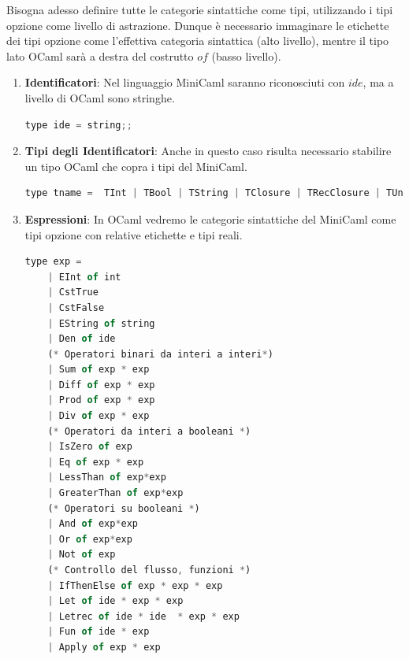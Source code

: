\documentclass{article}
\begin{document}
Bisogna adesso definire tutte le categorie sintattiche come tipi, utilizzando i tipi opzione come livello di astrazione. Dunque è necessario immaginare le etichette dei tipi opzione come l'effettiva categoria sintattica (alto livello), mentre il tipo lato OCaml sarà a destra del costrutto $of$ (basso livello).


\begin{enumerate}
    \item \textbf{Identificatori}: Nel linguaggio MiniCaml saranno riconosciuti con $ide$, ma a livello di OCaml sono stringhe.
    \vspace*{10px}
\begin{lstlisting}[language = JavaScript]
    type ide = string;;
\end{lstlisting}
\vspace*{-20px}

    \item \textbf{Tipi degli Identificatori}: Anche in questo caso risulta necessario stabilire un tipo OCaml che copra i tipi del MiniCaml.
    \vspace*{10px}
\begin{lstlisting}[language = JavaScript]
    type tname =  TInt | TBool | TString | TClosure | TRecClosure | TUnBound
\end{lstlisting}
\vspace*{-20px}

\newpage

    \item \textbf{Espressioni}: In OCaml vedremo le categorie sintattiche del MiniCaml come tipi opzione con relative etichette e tipi reali.
    \vspace*{10px}
\begin{lstlisting}[language = JavaScript]
    type exp = 
    | EInt of int
    | CstTrue 
    | CstFalse
    | EString of string
    | Den of ide
    (* Operatori binari da interi a interi*)
    | Sum of exp * exp
    | Diff of exp * exp
    | Prod of exp * exp
    | Div of exp * exp
    (* Operatori da interi a booleani *)
    | IsZero of exp
    | Eq of exp * exp
    | LessThan of exp*exp
    | GreaterThan of exp*exp
    (* Operatori su booleani *)
    | And of exp*exp
    | Or of exp*exp
    | Not of exp
    (* Controllo del flusso, funzioni *)
    | IfThenElse of exp * exp * exp
    | Let of ide * exp * exp
    | Letrec of ide * ide  * exp * exp
    | Fun of ide * exp
    | Apply of exp * exp
\end{lstlisting}
\vspace*{-20px}


\end{enumerate}
\end{document}
